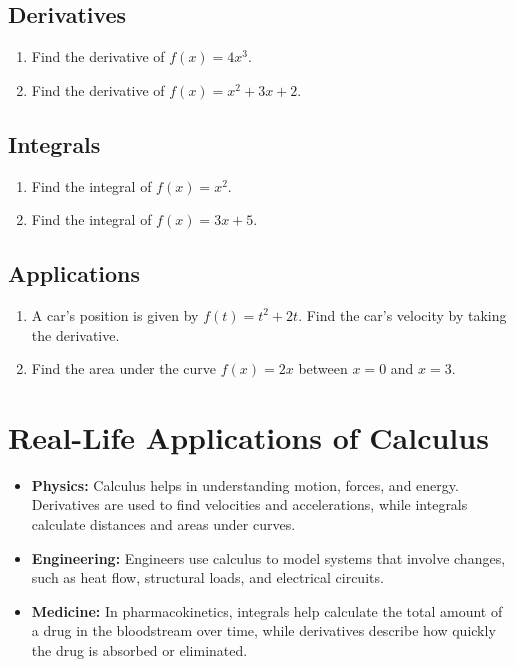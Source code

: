 \subsection{Derivatives}
\begin{enumerate}
    \item Find the derivative of \( f(x) = 4x^3 \).
    \item Find the derivative of \( f(x) = x^2 + 3x + 2 \).
\end{enumerate}

\subsection{Integrals}
\begin{enumerate}
    \item Find the integral of \( f(x) = x^2 \).
    \item Find the integral of \( f(x) = 3x + 5 \).
\end{enumerate}

\subsection{Applications}
\begin{enumerate}
    \item A car’s position is given by \( f(t) = t^2 + 2t \). Find the car’s velocity by taking the derivative.
    \item Find the area under the curve \( f(x) = 2x \) between \( x = 0 \) and \( x = 3 \).
\end{enumerate}

\section{Real-Life Applications of Calculus}
\begin{itemize}
    \item \textbf{Physics:} Calculus helps in understanding motion, forces, and energy. Derivatives are used to find velocities and accelerations, while integrals calculate distances and areas under curves.
    \item \textbf{Engineering:} Engineers use calculus to model systems that involve changes, such as heat flow, structural loads, and electrical circuits.
    \item \textbf{Medicine:} In pharmacokinetics, integrals help calculate the total amount of a drug in the bloodstream over time, while derivatives describe how quickly the drug is absorbed or eliminated.
\end{itemize}


